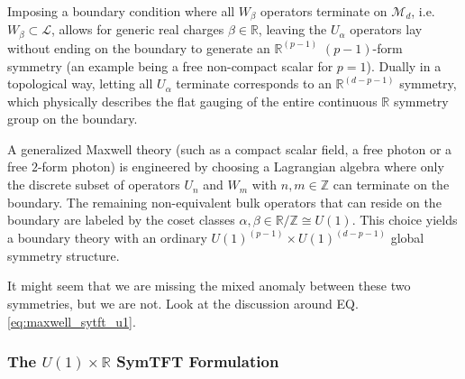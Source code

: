 \documentclass[aps,preprint,nofootinbib,preprintnumbers,eqsecnum,superscriptaddress]{revtex4}
\numberwithin{equation}{section}
\begin{document}
Imposing a boundary condition where all $W_\beta$ operators terminate on $\mathcal{M}_d$, i.e. $W_\beta \subset \mathcal{L}$, allows for generic real charges $\beta \in \mathbb{R}$, leaving the $U_\alpha$ operators lay without ending on the boundary to generate an $\mathbb{R}^{(p-1)}$ $(p-1)$-form symmetry (an example being a free non-compact scalar for $p=1$). Dually in a topological way, letting all $U_\alpha$ terminate corresponds to an $\mathbb{R}^{(d-p-1)}$ symmetry, which physically describes the flat gauging of the entire continuous $\mathbb{R}$ symmetry group on the boundary.

A generalized Maxwell theory (such as a compact scalar field, a free photon or a free $2$-form photon) is engineered by choosing a Lagrangian algebra where only the discrete subset of operators $U_n$ and $W_m$ with $n,m \in \mathbb{Z}$ can terminate on the boundary. The remaining non-equivalent bulk operators that can reside on the boundary are labeled by the coset classes $\alpha, \beta \in \mathbb{R}/\mathbb{Z} \cong U(1)$. This choice yields a boundary theory with an ordinary $U(1)^{(p-1)} \times U(1)^{(d-p-1)}$ global symmetry structure. 

It might seem that we are missing the mixed anomaly between these two symmetries, but we are not. Look at the discussion around EQ. \ref{eq:maxwell_sytft_u1}.

\subsubsection{The $U(1) \times \mathbb{R}$ SymTFT Formulation}
\label{sec:U1_R_symtft}
\end{document}
